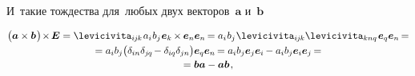 \begin{otherlanguage}{russian}

\vspace{-0.15em}\noindent
И~такие тождества для~любых двух векторов~$\bm{a}$ и~$\bm{b}$

\nopagebreak\vspace{-0.5em}
\begin{multline}\label{vectorcrossvectorcrossidentity}
\bigl( \bm{a} \times \bm{b} \hspace{.15ex}\bigr) \hspace{-0.33ex} \times \hspace{-0.22ex} \UnitDyad
= \levicivita_{i\hspace{-0.1ex}j\hspace{-0.1ex}k} \hspace{.2ex} a_i \hspace{.1ex} b_j \hspace{.1ex} \bm{e}_k \hspace{-0.15ex} \times \hspace{-0.1ex} \bm{e}_n \bm{e}_n \hspace{-0.2ex}
= a_i \hspace{.1ex} b_j \hspace{.1ex} \levicivita_{i\hspace{-0.1ex}j\hspace{-0.1ex}k} \levicivita_{knq} \hspace{.2ex} \bm{e}_q \bm{e}_n \hspace{-0.2ex} =
\\[-0.1em]
%
= a_i b_j \bigl( \delta_{in} \delta_{j\hspace{-0.1ex}q} \hspace{-0.22ex} - \delta_{iq} \delta_{jn} \bigr) \bm{e}_q \bm{e}_n \hspace{-0.2ex}
= a_i b_j \bm{e}_j \bm{e}_i \hspace{-0.12ex} - a_i b_j \bm{e}_i \bm{e}_j \hspace{-0.2ex} =
\\[-0.1em]
%
= \bm{b} \bm{a} - \bm{a} \bm{b}
\hspace{.2ex},
\end{multline}


\end{otherlanguage}

